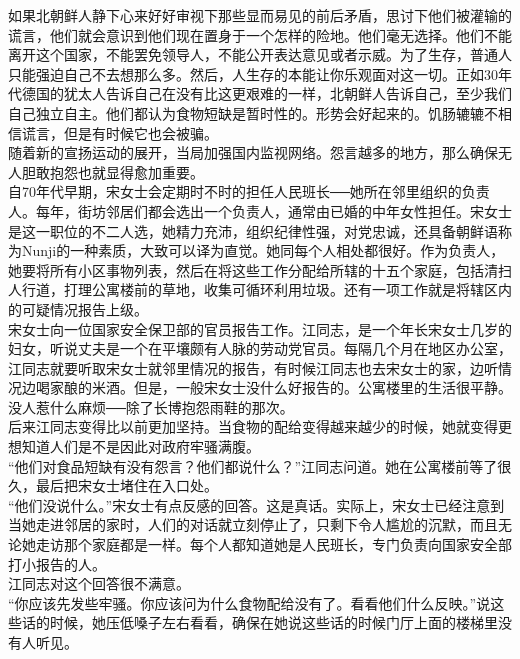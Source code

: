 如果北朝鲜人静下心来好好审视下那些显而易见的前后矛盾，思讨下他们被灌输的谎言，他们就会意识到他们现在置身于一个怎样的险地。他们毫无选择。他们不能离开这个国家，不能罢免领导人，不能公开表达意见或者示威。为了生存，普通人只能强迫自己不去想那么多。然后，人生存的本能让你乐观面对这一切。正如30年代德国的犹太人告诉自己在没有比这更艰难的一样，北朝鲜人告诉自己，至少我们自己独立自主。他们都认为食物短缺是暂时性的。形势会好起来的。饥肠辘辘不相信谎言，但是有时候它也会被骗。\\

随着新的宣扬运动的展开，当局加强国内监视网络。怨言越多的地方，那么确保无人胆敢抱怨也就显得愈加重要。\\

自70年代早期，宋女士会定期时不时的担任人民班长──她所在邻里组织的负责人。每年，街坊邻居们都会选出一个负责人，通常由已婚的中年女性担任。宋女士是这一职位的不二人选，她精力充沛，组织纪律性强，对党忠诚，还具备朝鲜语称为Nunji的一种素质，大致可以译为直觉。她同每个人相处都很好。作为负责人，她要将所有小区事物列表，然后在将这些工作分配给所辖的十五个家庭，包括清扫人行道，打理公寓楼前的草地，收集可循环利用垃圾。还有一项工作就是将辖区内的可疑情况报告上级。\\

宋女士向一位国家安全保卫部的官员报告工作。江同志，是一个年长宋女士几岁的妇女，听说丈夫是一个在平壤颇有人脉的劳动党官员。每隔几个月在地区办公室，江同志就要听取宋女士就邻里情况的报告，有时候江同志也去宋女士的家，边听情况边喝家酿的米酒。但是，一般宋女士没什么好报告的。公寓楼里的生活很平静。没人惹什么麻烦──除了长博抱怨雨鞋的那次。\\

后来江同志变得比以前更加坚持。当食物的配给变得越来越少的时候，她就变得更想知道人们是不是因此对政府牢骚满腹。\\

“他们对食品短缺有没有怨言？他们都说什么？”江同志问道。她在公寓楼前等了很久，最后把宋女士堵住在入口处。\\

“他们没说什么。”宋女士有点反感的回答。这是真话。实际上，宋女士已经注意到当她走进邻居的家时，人们的对话就立刻停止了，只剩下令人尴尬的沉默，而且无论她走访那个家庭都是一样。每个人都知道她是人民班长，专门负责向国家安全部打小报告的人。\\

江同志对这个回答很不满意。\\

“你应该先发些牢骚。你应该问为什么食物配给没有了。看看他们什么反映。”说这些话的时候，她压低嗓子左右看看，确保在她说这些话的时候门厅上面的楼梯里没有人听见。\\

